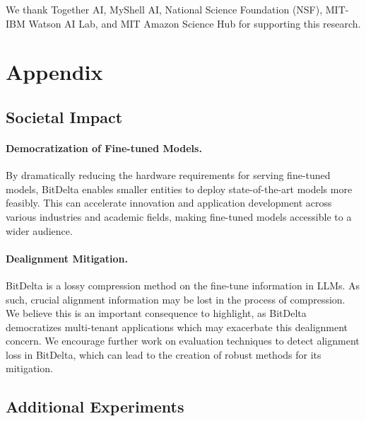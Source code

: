 \documentclass[numbers]{article}
\newcommand{\oursmethod}{BitDelta\xspace}
\begin{document}
\begin{ack}
We thank Together AI, MyShell AI, National Science Foundation (NSF), MIT-IBM Watson AI Lab, and MIT Amazon Science Hub for supporting this research.
\end{ack}






\clearpage

\appendix

\section{Appendix}

\subsection{Societal Impact}
\label{sec:impact}
\paragraph{Democratization of Fine-tuned Models.}
By dramatically reducing the hardware requirements for serving fine-tuned models, \oursmethod enables smaller entities to deploy state-of-the-art models more feasibly. This can accelerate innovation and application development across various industries and academic fields, making fine-tuned models accessible to a wider audience.

\paragraph{Dealignment Mitigation.}
\oursmethod is a lossy compression method on the fine-tune information in LLMs. As such, crucial alignment information may be lost in the process of compression. We believe this is an important consequence to highlight, as \oursmethod democratizes multi-tenant applications which may exacerbate this dealignment concern. We encourage further work on evaluation techniques to detect alignment loss in \oursmethod, which can lead to the creation of robust methods for its mitigation.

\subsection{Additional Experiments}
\end{document}
